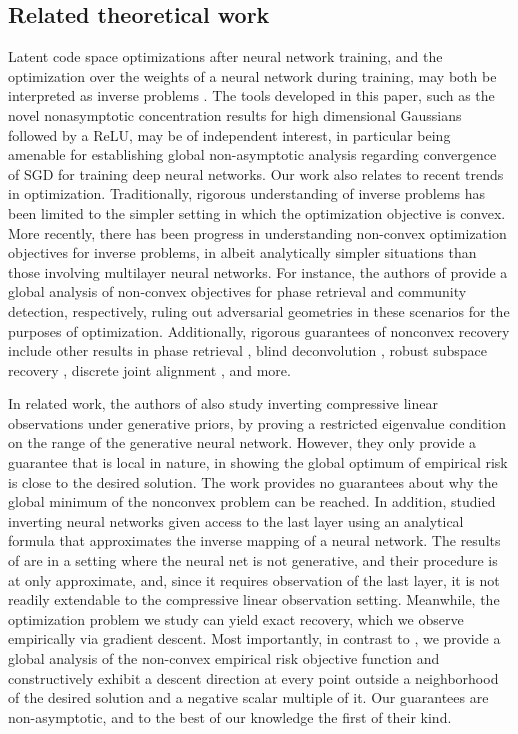 \documentclass[11pt]{article}
\newcommand{\red}[1]{{\color{black} #1}}
\begin{document}
\subsection{Related theoretical work}
Latent code space optimizations after neural network training, and the optimization over the weights of a neural network during training, may both be interpreted as inverse problems \cite{Mallat}. The tools developed in this paper, such as the novel nonasymptotic concentration results for high dimensional Gaussians followed by a ReLU, may be of independent interest, in particular being amenable for establishing global non-asymptotic analysis regarding convergence of SGD for training deep neural networks. Our work also relates to recent trends in optimization. Traditionally, rigorous understanding of inverse problems has been limited to the simpler setting in which the optimization objective is convex. 
 More recently, there has been progress in understanding non-convex optimization objectives for inverse problems, in albeit analytically simpler situations than those involving multilayer neural networks. For instance, the authors of \cite{WrightPR, Burer1} provide a global analysis of non-convex objectives for phase retrieval and community detection, respectively, ruling out adversarial geometries in these scenarios for the purposes of optimization.  Additionally, rigorous guarantees of nonconvex recovery include other results in phase retrieval \cite{wirtinger, chen2015solving}, blind deconvolution \cite{li2016rapid, ma2017implicit,  huang2017blind}, robust subspace recovery \cite{maunu2017well}, discrete joint alignment \cite{chen2016projected}, and more.   

In related work, the authors of \cite{Price} also study inverting compressive linear observations under generative priors, by proving a restricted eigenvalue condition on the range of the generative neural network. However, they only provide a guarantee that is local in nature, in showing the global optimum of empirical risk is close to the desired solution.  The work provides no guarantees about why the global minimum of the nonconvex problem can be reached.   In addition, \cite{Sanjeev} studied inverting neural networks given access to the last layer using an analytical formula that approximates the inverse mapping of a neural network. The results of \cite{Sanjeev} are in a setting where the neural net is not generative, and their procedure is at only approximate, and, since it requires observation of the last layer, it is not readily extendable to the compressive linear observation setting. Meanwhile, the optimization problem we study can yield exact recovery, which we observe empirically via gradient descent. Most importantly, in contrast to \cite{Price,Sanjeev}, we provide a global analysis of the non-convex empirical risk objective function and constructively exhibit a descent direction at every point outside a neighborhood of the desired solution and a negative scalar multiple of it. Our guarantees are non-asymptotic, and to the best of our knowledge the first of their kind. %
\end{document}
